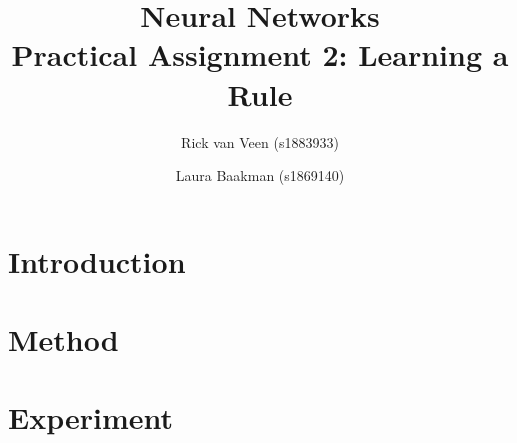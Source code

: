 \documentclass[twoside, a4paper, twocolumn]{article}
\title{Neural Networks\\Practical Assignment 2: Learning a Rule}
\author{Rick van Veen (s1883933) \and Laura Baakman (s1869140)}
\begin{document}
\twocolumn[\maketitle]





\section{Introduction}

	
\section{Method}
\label{s:method}
	

\section{Experiment}
	

\printbibliography

\end{document}
